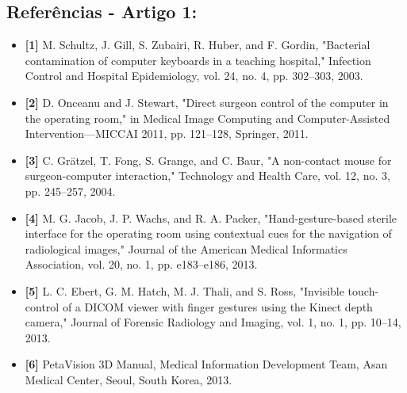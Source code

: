 \documentclass[12pt, a4paper]{article}
\begin{document}
\subsection{Referências - Artigo 1:}
\begin{itemize}[label=]
    \item \textbf{[1]} M. Schultz, J. Gill, S. Zubairi, R. Huber, and F. Gordin, "Bacterial contamination of computer keyboards in a teaching hospital," Infection Control and Hospital Epidemiology, vol. 24, no. 4, pp. 302–303, 2003.
    \item \textbf{[2]} D. Onceanu and J. Stewart, "Direct surgeon control of the computer in the operating room," in Medical Image Computing and Computer-Assisted Intervention—MICCAI 2011, pp. 121–128, Springer, 2011.
    \item \textbf{[3]} C. Grätzel, T. Fong, S. Grange, and C. Baur, "A non-contact mouse for surgeon-computer interaction," Technology and Health Care, vol. 12, no. 3, pp. 245–257, 2004.
    \item \textbf{[4]} M. G. Jacob, J. P. Wachs, and R. A. Packer, "Hand-gesture-based sterile interface for the operating room using contextual cues for the navigation of radiological images," Journal of the American Medical Informatics Association, vol. 20, no. 1, pp. e183–e186, 2013.
    \item \textbf{[5]} L. C. Ebert, G. M. Hatch, M. J. Thali, and S. Ross, "Invisible touch-control of a DICOM viewer with finger gestures using the Kinect depth camera," Journal of Forensic Radiology and Imaging, vol. 1, no. 1, pp. 10–14, 2013.
    \item \textbf{[6]} PetaVision 3D Manual, Medical Information Development Team, Asan Medical Center, Seoul, South Korea, 2013.
\end{itemize}
\end{document}
